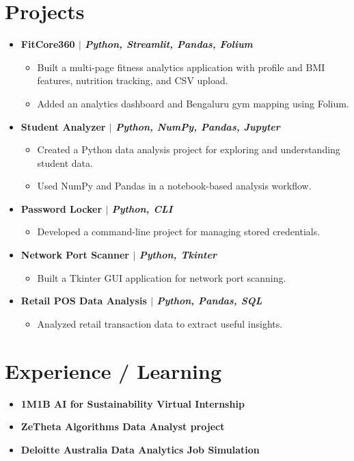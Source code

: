\documentclass[letterpaper, 11pt]{article}
\newcommand{\resumeItem}[1]{\item\small{{#1 \vspace{-2pt}}}}
\newcommand{\resumeProjectHeading}[2]{\item\textbf{#1} \hfill #2 \vspace{-7pt}}
\newcommand{\resumeSubHeadingListStart}{\begin{itemize}[leftmargin=0.15in, label={}]}
\newcommand{\resumeSubHeadingListEnd}{\end{itemize}}
\newcommand{\resumeItemListStart}{\begin{itemize}}
\newcommand{\resumeItemListEnd}{\end{itemize}\vspace{-5pt}}
\begin{document}
\section{Projects}
  \resumeSubHeadingListStart
    \resumeProjectHeading{\textbf{FitCore360} $|$ \emph{Python, Streamlit, Pandas, Folium}}{}
      \resumeItemListStart
        \resumeItem{Built a multi-page fitness analytics application with profile and BMI features, nutrition tracking, and CSV upload.}
        \resumeItem{Added an analytics dashboard and Bengaluru gym mapping using Folium.}
      \resumeItemListEnd
    \resumeProjectHeading{\textbf{Student Analyzer} $|$ \emph{Python, NumPy, Pandas, Jupyter}}{}
      \resumeItemListStart
        \resumeItem{Created a Python data analysis project for exploring and understanding student data.}
        \resumeItem{Used NumPy and Pandas in a notebook-based analysis workflow.}
      \resumeItemListEnd
    \resumeProjectHeading{\textbf{Password Locker} $|$ \emph{Python, CLI}}{}
      \resumeItemListStart
        \resumeItem{Developed a command-line project for managing stored credentials.}
      \resumeItemListEnd
    \resumeProjectHeading{\textbf{Network Port Scanner} $|$ \emph{Python, Tkinter}}{}
      \resumeItemListStart
        \resumeItem{Built a Tkinter GUI application for network port scanning.}
      \resumeItemListEnd
    \resumeProjectHeading{\textbf{Retail POS Data Analysis} $|$ \emph{Python, Pandas, SQL}}{}
      \resumeItemListStart
        \resumeItem{Analyzed retail transaction data to extract useful insights.}
      \resumeItemListEnd
  \resumeSubHeadingListEnd

\section{Experience / Learning}
  \resumeSubHeadingListStart
    \resumeItem{\textbf{1M1B AI for Sustainability Virtual Internship}}
    \resumeItem{\textbf{ZeTheta Algorithms Data Analyst project}}
    \resumeItem{\textbf{Deloitte Australia Data Analytics Job Simulation}}
  \resumeSubHeadingListEnd
\end{document}
